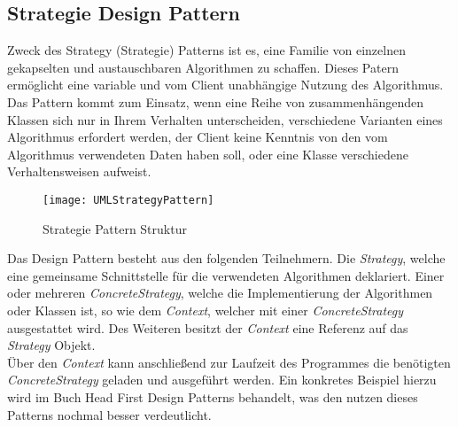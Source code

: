 \subsection{Strategie Design Pattern}\label{sec:StrategyPattern}
Zweck des Strategy (Strategie) Patterns ist es, eine Familie von einzelnen gekapselten und austauschbaren Algorithmen zu schaffen. Dieses Patern ermöglicht eine variable und vom Client unabhängige Nutzung des Algorithmus.\\
Das Pattern kommt zum Einsatz, wenn eine Reihe von zusammenhängenden Klassen sich nur in Ihrem Verhalten unterscheiden, verschiedene Varianten eines Algorithmus erfordert werden, der Client keine Kenntnis von den vom Algorithmus verwendeten Daten haben soll, oder eine Klasse verschiedene Verhaltensweisen aufweist.\\
\begin{center}
    \begin{figure}[h]
     \centering
     \texttt{[image: UMLStrategyPattern]}
     \caption{Strategie Pattern Struktur \cite{DesignPatterns}}
    \label{fig:StrategyPattern}
    \end{figure}
\end{center}
\vspace{-2cm}
Das Design Pattern besteht aus den folgenden Teilnehmern. Die \textit{Strategy}, welche eine gemeinsame Schnittstelle für die verwendeten Algorithmen deklariert. Einer oder mehreren \textit{ConcreteStrategy}, welche die Implementierung der Algorithmen oder Klassen ist, so wie dem \textit{Context}, welcher mit einer \textit{ConcreteStrategy} ausgestattet wird. Des Weiteren besitzt der \textit{Context} eine Referenz auf das \textit{Strategy} Objekt.\cite[S.383 ff]{DesignPatterns}\\
Über den \textit{Context} kann anschließend zur Laufzeit des Programmes die benötigten \textit{ConcreteStrategy} geladen und ausgeführt werden. 
Ein konkretes Beispiel hierzu wird im Buch Head First Design Patterns \cite{HeadfirstDesignPatterns} behandelt, was den nutzen dieses Patterns nochmal besser verdeutlicht.